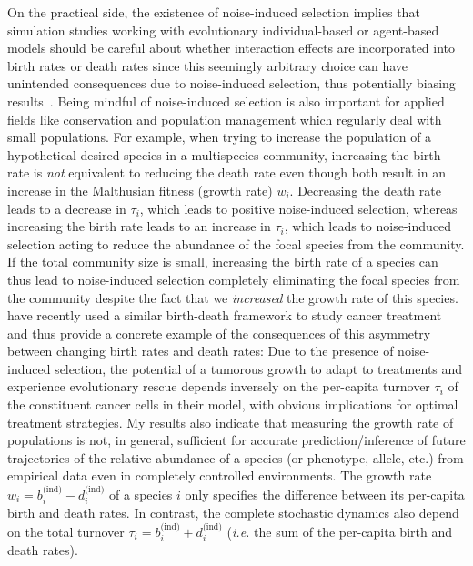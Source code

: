 On the practical side, the existence of noise-induced selection implies that simulation studies working with evolutionary individual-based or agent-based models should be careful about whether interaction effects are incorporated into birth rates or death rates since this seemingly arbitrary choice can have unintended consequences due to noise-induced selection, thus potentially biasing results~\citep{mcleod_social_2019,kuosmanen_turnover_2022}. Being mindful of noise-induced selection is also important for applied fields like conservation and population management which regularly deal with small populations. For example, when trying to increase the population of a hypothetical desired species in a multispecies community, increasing the birth rate is \emph{not} equivalent to reducing the death rate even though both result in an increase in the Malthusian fitness (growth rate) $w_i$. Decreasing the death rate leads to a decrease in $\tau_i$, which leads to positive noise-induced selection, whereas increasing the birth rate leads to an increase in $\tau_i$, which leads to noise-induced selection acting to reduce the abundance of the focal species from the community. If the total community size is small, increasing the birth rate of a species can thus lead to noise-induced selection completely eliminating the focal species from the community despite the fact that we \emph{increased} the growth rate of this species.~\cite{raatz_promoting_2023} have recently used a similar birth-death framework to study cancer treatment and thus provide a concrete example of the consequences of this asymmetry between changing birth rates and death rates: Due to the presence of noise-induced selection, the potential of a tumorous growth to adapt to treatments and experience evolutionary rescue depends inversely on the per-capita turnover $\tau_i$ of the constituent cancer cells in their model, with obvious implications for optimal treatment strategies. My results also indicate that measuring the growth rate of populations is not, in general, sufficient for accurate prediction/inference of future trajectories of the relative abundance of a species (or phenotype, allele, etc.) from empirical data even in completely controlled environments. The growth rate $w_i = b^{\textrm{(ind)}}_{i} - d^{\textrm{(ind)}}_{i}$ of a species $i$ only specifies the difference between its per-capita birth and death rates. In contrast, the complete stochastic dynamics also depend on the total turnover $\tau_i = b^{\textrm{(ind)}}_{i} + d^{\textrm{(ind)}}_{i}$ (\emph{i.e.} the sum of the per-capita birth and death rates).

